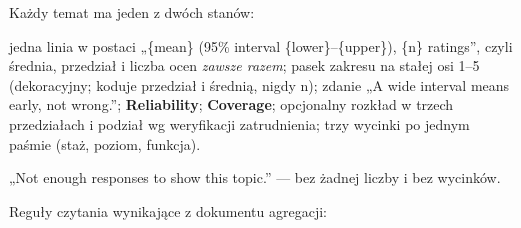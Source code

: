 {Każdy temat ma jeden z dwóch stanów:

\begin{description}[leftmargin=*,itemsep=2pt]
  \item[\texttt{ok}] jedna linia w postaci
        „\{mean\} (95\% interval \{lower\}--\{upper\}), \{n\} ratings”, czyli średnia,
        przedział i liczba ocen \emph{zawsze razem}; pasek zakresu na stałej
        osi 1--5 (dekoracyjny; koduje przedział i średnią, nigdy n); zdanie „A wide
        interval means early, not wrong.”; \textbf{Reliability}; \textbf{Coverage};
        opcjonalny rozkład w trzech przedziałach i podział wg weryfikacji
        zatrudnienia; trzy wycinki po jednym paśmie (staż, poziom, funkcja).
  \item[\texttt{insufficient\_\allowbreak{}data}] „Not enough responses to show this topic.” --- bez
        żadnej liczby i bez wycinków.
\end{description}

Reguły czytania wynikające z dokumentu agregacji:

}
